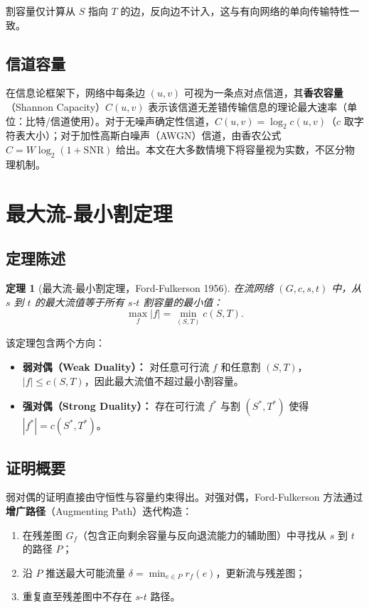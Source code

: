 \documentclass[12pt, a4paper]{article}
\newtheorem{theorem}{定理}[section]
\begin{document}
割容量仅计算从 $S$ 指向 $T$ 的边，反向边不计入，这与有向网络的单向传输特性一致。

\subsection{信道容量}

在信息论框架下，网络中每条边 $(u,v)$ 可视为一条点对点信道，其\textbf{香农容量}（Shannon Capacity）$C(u,v)$ 表示该信道无差错传输信息的理论最大速率（单位：比特/信道使用）。对于无噪声确定性信道，$C(u,v) = \log_2 c(u,v)$（$c$ 取字符表大小）；对于加性高斯白噪声（AWGN）信道，由香农公式 $C = W\log_2(1+\text{SNR})$ 给出。本文在大多数情境下将容量视为实数，不区分物理机制。

\section{最大流-最小割定理}

\subsection{定理陈述}

\begin{theorem}[最大流-最小割定理，Ford-Fulkerson 1956]\label{thm:maxflow-mincut}
在流网络 $(G,c,s,t)$ 中，从 $s$ 到 $t$ 的最大流值等于所有 $s$-$t$ 割容量的最小值：
\[
  \max_{f} |f| = \min_{(S,T)} c(S,T).
\]
\end{theorem}

该定理包含两个方向：
\begin{itemize}
  \item \textbf{弱对偶（Weak Duality）：} 对任意可行流 $f$ 和任意割 $(S,T)$，$|f|\leq c(S,T)$，因此最大流值不超过最小割容量。
  \item \textbf{强对偶（Strong Duality）：} 存在可行流 $f^*$ 与割 $(S^*,T^*)$ 使得 $|f^*| = c(S^*,T^*)$。
\end{itemize}

\subsection{证明概要}

弱对偶的证明直接由守恒性与容量约束得出。对强对偶，Ford-Fulkerson 方法通过\textbf{增广路径}（Augmenting Path）迭代构造：

\begin{enumerate}
  \item 在残差图 $G_f$（包含正向剩余容量与反向退流能力的辅助图）中寻找从 $s$ 到 $t$ 的路径 $P$；
  \item 沿 $P$ 推送最大可能流量 $\delta = \min_{e\in P} r_f(e)$，更新流与残差图；
  \item 重复直至残差图中不存在 $s$-$t$ 路径。
\end{enumerate}
\end{document}
